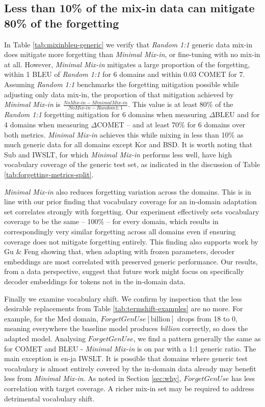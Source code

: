 \documentclass[11pt]{article}
\begin{document}
\subsection{Less than 10\% of the mix-in data can mitigate  80\% of the forgetting}
In   Table \ref{tab:mixinbleu-generic} we verify that \emph{Random 1:1} generic data mix-in  does mitigate more forgetting than \emph{Minimal Mix-in}, or fine-tuning with no mix-in at all. However, \emph{Minimal Mix-in}  mitigates a large proportion of the forgetting, within 1 BLEU of \emph{Random 1:1} for 6 domains and within 0.03 COMET for 7. Assuming \emph{Random 1:1} benchmarks the forgetting mitigation possible while adjusting only data mix-in, the proportion of that mitigation achieved by \emph{Minimal Mix-in} is $\frac{No Mix\text{-}in - Minimal Mix\text{-}in}{No Mix\text{-}in - Random 1:1}$. This value is at least 80\% of the \emph{Random 1:1} forgetting mitigation for 6 domains when measuring $\Delta$BLEU and for 4 domains when measuring $\Delta$COMET -- and at least 70\% for 6 domains over both metrics. \emph{Minimal Mix-in} achieves this while mixing in less than 10\% as much generic data for all domains except Kor and BSD. It is worth noting that Sub and IWSLT, for which \emph{Minimal Mix-in} performs less well,  have high vocabulary coverage of the generic test set, as indicated in the discussion of Table \ref{tab:forgetting-metrics-split}. 

\emph{Minimal Mix-in} also reduces forgetting variation across the  domains. This is in line with our prior finding that vocabulary coverage for an in-domain adaptation set correlates strongly with forgetting. Our experiment effectively sets vocabulary coverage to be the same -- 100\% -- for every domain, which results in correspondingly very similar forgetting across all domains even if ensuring coverage does not mitigate forgetting entirely. This finding also supports work by Gu \& Feng  showing that, when adapting with frozen parameters, decoder embeddings are most correlated with  preserved generic performance.  Our results, from a data perspective,  suggest that future work might focus on specifically decoder embeddings for tokens not in the in-domain data. 


Finally we examine vocabulary shift. We confirm by inspection that the less desirable replacements from Table \ref{tab:termshift-examples} are no more. For example, for the Med domain, $ForgetGenUse[\text{billion}]$ drops from 18 to 0, meaning everywhere the baseline model produces \emph{billion} correctly, so does the adapted model. Analysing $ForgetGenUse$, we find a pattern generally the same as for COMET and BLEU - \emph{Minimal Mix-in} is on par with a 1:1 generic ratio. The main exception is en-ja IWSLT. It is possible that domains where generic test vocabulary is almost entirely covered by the in-domain data already may benefit less from \emph{Minimal Mix-in}. As noted in Section \ref{sec:why},  $ForgetGenUse$ has less correlation with target coverage. A richer mix-in set may be required to address detrimental vocabulary shift.  
\end{document}
